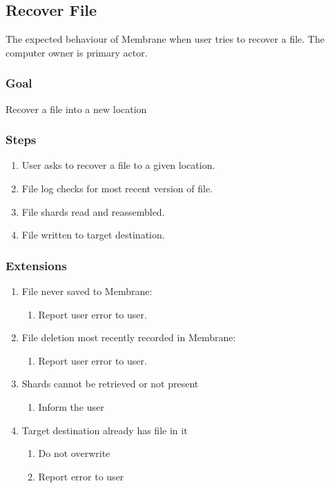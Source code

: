 \documentclass[11pt, a4paper, twoside]{report}
\begin{document}
\subsection{Recover File}

The expected behaviour of Membrane when user tries to recover a file. The computer owner is primary actor.

\subsubsection{Goal}

Recover a file into a new location

\subsubsection{Steps}

\begin{enumerate}
 \item User asks to recover a file to a given location.
 \item File log checks for most recent version of file.
 \item File shards read and reassembled.
 \item File written to target destination.
\end{enumerate}

\subsubsection{Extensions}
\begin{enumerate}
  \item File never saved to Membrane:
	\begin{enumerate}
	  \item Report user error to user.
	\end{enumerate}
  \item File deletion most recently recorded in Membrane:
	\begin{enumerate}
	  \item Report user error to user.
	\end{enumerate}
  \item Shards cannot be retrieved or not present
	\begin{enumerate}
	  \item Inform the user
	\end{enumerate}
  \item Target destination already has file in it
	\begin{enumerate}
	  \item Do not overwrite
	  \item Report error to user
	\end{enumerate}
\end{enumerate}
\end{document}
